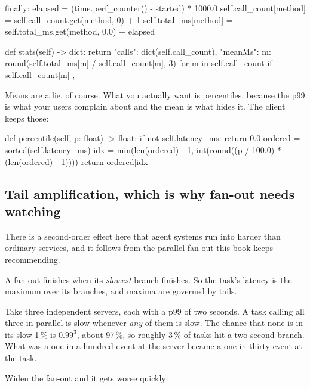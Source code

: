 \begin{py}
finally:
    elapsed = (time.perf_counter() - started) * 1000.0
    self.call_count[method] = self.call_count.get(method, 0) + 1
    self.total_ms[method] = self.total_ms.get(method, 0.0) + elapsed
\end{py}

\begin{py}
def stats(self) -> dict:
    return {
        "calls": dict(self.call_count),
        "meanMs": {
            m: round(self.total_ms[m] / self.call_count[m], 3)
            for m in self.call_count if self.call_count[m]
        },
    }
\end{py}

Means are a lie, of course. What you actually want is percentiles, because the
p99 is what your users complain about and the mean is what hides it. The client
keeps those:

\begin{py}
def percentile(self, p: float) -> float:
    if not self.latency_ms:
        return 0.0
    ordered = sorted(self.latency_ms)
    idx = min(len(ordered) - 1, int(round((p / 100.0) * (len(ordered) - 1))))
    return ordered[idx]
\end{py}


\subsection{Tail amplification, which is why fan-out needs watching}

There is a second-order effect here that agent systems run into harder than
ordinary services, and it follows from the parallel fan-out this book keeps
recommending.

A fan-out finishes when its \emph{slowest} branch finishes. So the task's latency
is the maximum over its branches, and maxima are governed by tails.

Take three independent servers, each with a p99 of two seconds. A task calling
all three in parallel is slow whenever \emph{any} of them is slow. The chance
that none is in its slow 1\,\% is $0.99^3$, about 97\,\%, so roughly 3\,\% of
tasks hit a two-second branch. What was a one-in-a-hundred event at the server
became a one-in-thirty event at the task.

Widen the fan-out and it gets worse quickly:

